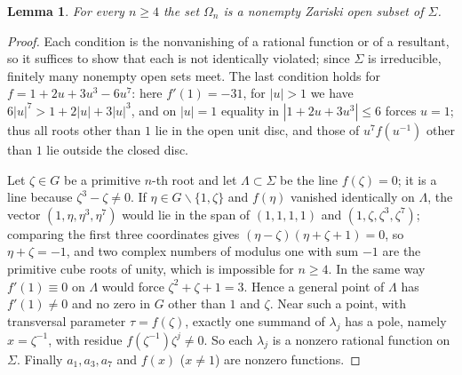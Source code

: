 \documentclass{amsart}
\newtheorem{lemma}[theorem]{Lemma}
\theoremstyle{definition}
\theoremstyle{remark}
\numberwithin{equation}{section}
\begin{document}
\begin{lemma}\label{lem:denom}
For every $n\ge4$ the set $\Omega_n$ is a nonempty Zariski open subset of $\Sigma$.
\end{lemma}

\begin{proof}
Each condition is the nonvanishing of a rational function or of a resultant, so it
suffices to show that each is not identically violated; since $\Sigma$ is
irreducible, finitely many nonempty open sets meet. The last condition holds for
$f=1+2u+3u^3-6u^7$: here $f'(1)=-31$, for $|u|>1$ we have
$6|u|^7>1+2|u|+3|u|^3$, and on $|u|=1$ equality in $|1+2u+3u^3|\le6$ forces $u=1$;
thus all roots other than $1$ lie in the open unit disc, and those of $u^7f(u^{-1})$
other than $1$ lie outside the closed disc.

Let $\zeta\in G$ be a primitive $n$-th root and let $\Lambda\subset\Sigma$ be the line
$f(\zeta)=0$; it is a line because $\zeta^3-\zeta\ne0$. If $\eta\in G\smallsetminus
\{1,\zeta\}$ and $f(\eta)$ vanished identically on $\Lambda$, the vector
$(1,\eta,\eta^3,\eta^7)$ would lie in the span of $(1,1,1,1)$ and
$(1,\zeta,\zeta^3,\zeta^7)$; comparing the first three coordinates gives
$(\eta-\zeta)(\eta+\zeta+1)=0$, so $\eta+\zeta=-1$, and two complex numbers of modulus
one with sum $-1$ are the primitive cube roots of unity, which is impossible for
$n\ge4$. In the same way $f'(1)\equiv0$ on $\Lambda$ would force
$\zeta^2+\zeta+1=3$. Hence a general point of $\Lambda$ has $f'(1)\ne0$ and no zero
in $G$ other than $1$ and $\zeta$. Near such a point, with transversal parameter
$\tau=f(\zeta)$, exactly one summand of $\lambda_j$ has a pole, namely
$x=\zeta^{-1}$, with residue $f(\zeta^{-1})\zeta^j\ne0$. So each $\lambda_j$ is a
nonzero rational function on $\Sigma$. Finally $a_1,a_3,a_7$ and $f(x)$ ($x\ne1$) are
nonzero functions.
\end{proof}
\end{document}
